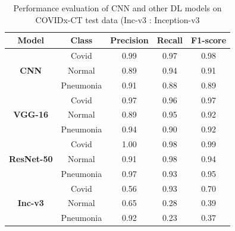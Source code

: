 \documentclass[10pt,journal,compsoc]{IEEEtran}
\begin{document}
\begin{table}
\renewcommand{\arraystretch}{1.3}
\caption{Performance evaluation of CNN and other DL models on COVIDx-CT test data (Inc-v3 : Inception-v3}\label{table_11}
\begin{tabular}{|c|c|c|c|c|}
    \hline
    
    \bfseries Model & \bfseries  Class     & \bfseries  Precision    & \bfseries Recall      & \bfseries F1-score     \\
    \hline
    \multirow{3}{*}{\bfseries CNN} & Covid      & 0.99        & 0.97          & 0.98     \\ 
    \cline{2-5}
    &    Normal     & 0.89        & 0.94          & 0.91                \\
    \cline{2-5}
    &    Pneumonia  & 0.91        & 0.88          & 0.89          \\
    \hline
    \multirow{3}{*}{\bfseries VGG-16} & Covid &  0.97          & 0.96          & 0.97     \\
    \cline{2-5}
    & Normal & 0.89          & 0.95          & 0.92   \\
    \cline{2-5}
    & Pneumonia & 0.94          & 0.90          & 0.92     \\
    \hline
    \multirow{3}{*}{\bfseries ResNet-50} & Covid &  1.00          & 0.98          & 0.99     \\
    \cline{2-5}
    & Normal & 0.91          & 0.98          & 0.94   \\
    \cline{2-5}
    & Pneumonia & 0.97          & 0.93          & 0.95     \\
    \hline
    \multirow{3}{*}{\bfseries Inc-v3} & Covid &  0.56          & 0.93          & 0.70     \\
    \cline{2-5}
    & Normal & 0.65          & 0.28          & 0.39   \\
    \cline{2-5}
    & Pneumonia & 0.92          & 0.23          & 0.37     \\
    \hline
    \end{tabular} 
     \end{table}
\end{document}

